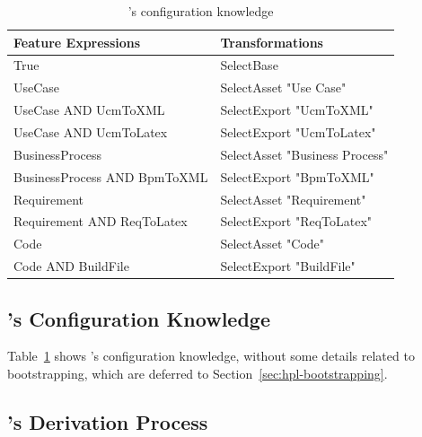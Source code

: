 \begin{table}[t!]
\begin{center}
\begin{tabular}{||l||l||}
  \hline
  \textbf{Feature Expressions} & \textbf{Transformations}   \\  \hline
  True & SelectBase \\  \hline
  UseCase & SelectAsset "Use Case" \\ \hline
  UseCase AND UcmToXML & SelectExport "UcmToXML"  \\ \hline
  UseCase AND UcmToLatex & SelectExport "UcmToLatex" \\ \hline
  BusinessProcess & SelectAsset "Business Process" \\ \hline
  BusinessProcess AND BpmToXML & SelectExport "BpmToXML" \\ \hline
  Requirement & SelectAsset "Requirement" \\ \hline
  Requirement AND ReqToLatex & SelectExport "ReqToLatex" \\ \hline
  Code & SelectAsset "Code" \\ \hline
  Code AND BuildFile & SelectExport "BuildFile" \\ \hline
\end{tabular}
\caption{\hpl's configuration knowledge}
\label{tab:hpl-ck}
\end{center}
\end{table}


\subsection{\hpl's Configuration Knowledge} 
\label{sec:hpl-ck}

Table~\ref{tab:hpl-ck} shows \hpl's configuration knowledge, without some details related to bootstrapping, which are deferred to Section~\ref{sec:hpl-bootstrapping}.


\subsection{\hpl's Derivation Process} 
\label{sec:hpl-derivation}

